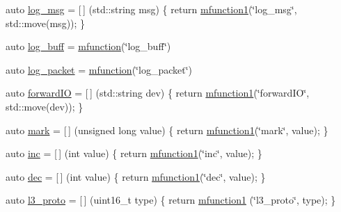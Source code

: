 \begin{DoxyCompactItemize}
\item 
auto \hyperlink{namespacepfq_1_1lang_1_1anonymous__namespace_02default_8hpp_03_a82e76226844f043aac9a2dd01615c9bb}{log\+\_\+msg} = \mbox{[}$\,$\mbox{]} (std\+::string msg) \{ return \hyperlink{namespacepfq_1_1lang_a68d775c68562fbd0ab9ef213f2519499}{mfunction1}(\char`\"{}log\+\_\+msg\char`\"{}, std\+::move(msg)); \}
\item 
auto \hyperlink{namespacepfq_1_1lang_1_1anonymous__namespace_02default_8hpp_03_ac16d4c4b496e6e882901d84ded462101}{log\+\_\+buff} = \hyperlink{namespacepfq_1_1lang_ac3ec84f09576bf5fb5db464623a4c165}{mfunction}(\char`\"{}log\+\_\+buff\char`\"{})
\item 
auto \hyperlink{namespacepfq_1_1lang_1_1anonymous__namespace_02default_8hpp_03_aed6076a98aece625738cbda3689183e2}{log\+\_\+packet} = \hyperlink{namespacepfq_1_1lang_ac3ec84f09576bf5fb5db464623a4c165}{mfunction}(\char`\"{}log\+\_\+packet\char`\"{})
\item 
auto \hyperlink{namespacepfq_1_1lang_1_1anonymous__namespace_02default_8hpp_03_a3fb6ec42e38c3329534ea3a7024fd967}{forward\+I\+O} = \mbox{[}$\,$\mbox{]} (std\+::string dev) \{ return \hyperlink{namespacepfq_1_1lang_a68d775c68562fbd0ab9ef213f2519499}{mfunction1}(\char`\"{}forward\+I\+O\char`\"{}, std\+::move(dev)); \}
\item 
auto \hyperlink{namespacepfq_1_1lang_1_1anonymous__namespace_02default_8hpp_03_a7b831baeabda070b89ca862a9445a4a8}{mark} = \mbox{[}$\,$\mbox{]} (unsigned long value) \{ return \hyperlink{namespacepfq_1_1lang_a68d775c68562fbd0ab9ef213f2519499}{mfunction1}(\char`\"{}mark\char`\"{}, value); \}
\item 
auto \hyperlink{namespacepfq_1_1lang_1_1anonymous__namespace_02default_8hpp_03_acc7d3a4cca5eb30ff5456e19c613b174}{inc} = \mbox{[}$\,$\mbox{]} (int value) \{ return \hyperlink{namespacepfq_1_1lang_a68d775c68562fbd0ab9ef213f2519499}{mfunction1}(\char`\"{}inc\char`\"{}, value); \}
\item 
auto \hyperlink{namespacepfq_1_1lang_1_1anonymous__namespace_02default_8hpp_03_a139906841e77a2eb86b761b27ceeb685}{dec} = \mbox{[}$\,$\mbox{]} (int value) \{ return \hyperlink{namespacepfq_1_1lang_a68d775c68562fbd0ab9ef213f2519499}{mfunction1}(\char`\"{}dec\char`\"{}, value); \}
\item 
auto \hyperlink{namespacepfq_1_1lang_1_1anonymous__namespace_02default_8hpp_03_a1515f230673119530cd04f213627976f}{l3\+\_\+proto} = \mbox{[}$\,$\mbox{]} (uint16\+\_\+t type) \{ return \hyperlink{namespacepfq_1_1lang_a68d775c68562fbd0ab9ef213f2519499}{mfunction1} (\char`\"{}l3\+\_\+proto\char`\"{}, type); \}

\end{DoxyCompactItemize}
